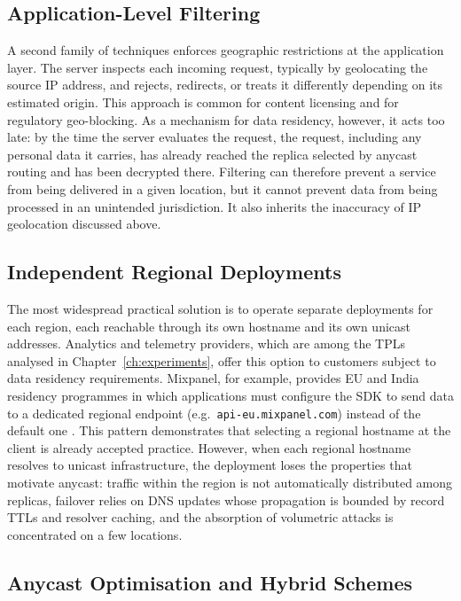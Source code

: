 \documentclass[
A4paper,                %
twoside,                %
openright,              %
chapterprefix=true,     %
12pt,                   %
headings=normal,        %
titlepage=on            %
]{book}
\begin{document}
\subsection{Application-Level Filtering}
\label{sc:rcadns_related_filtering}

A second family of techniques enforces geographic restrictions at the application layer. The server inspects each incoming request, typically by geolocating the source IP address, and rejects, redirects, or treats it differently depending on its estimated origin. This approach is common for content licensing and for regulatory geo-blocking. As a mechanism for data residency, however, it acts too late: by the time the server evaluates the request, the request, including any personal data it carries, has already reached the replica selected by anycast routing and has been decrypted there. Filtering can therefore prevent a service from being delivered in a given location, but it cannot prevent data from being processed in an unintended jurisdiction. It also inherits the inaccuracy of IP geolocation discussed above.

\subsection{Independent Regional Deployments}
\label{sc:rcadns_related_regional}

The most widespread practical solution is to operate separate deployments for each region, each reachable through its own hostname and its own unicast addresses. Analytics and telemetry providers, which are among the TPLs analysed in Chapter~\ref{ch:experiments}, offer this option to customers subject to data residency requirements. Mixpanel, for example, provides EU and India residency programmes in which applications must configure the SDK to send data to a dedicated regional endpoint (e.g.\ \texttt{api-eu.mixpanel.com}) instead of the default one \cite{EUMixpanel}. This pattern demonstrates that selecting a regional hostname at the client is already accepted practice. However, when each regional hostname resolves to unicast infrastructure, the deployment loses the properties that motivate anycast: traffic within the region is not automatically distributed among replicas, failover relies on DNS updates whose propagation is bounded by record TTLs and resolver caching, and the absorption of volumetric attacks is concentrated on a few locations.

\subsection{Anycast Optimisation and Hybrid Schemes}
\label{sc:rcadns_related_optimisation}
\end{document}
